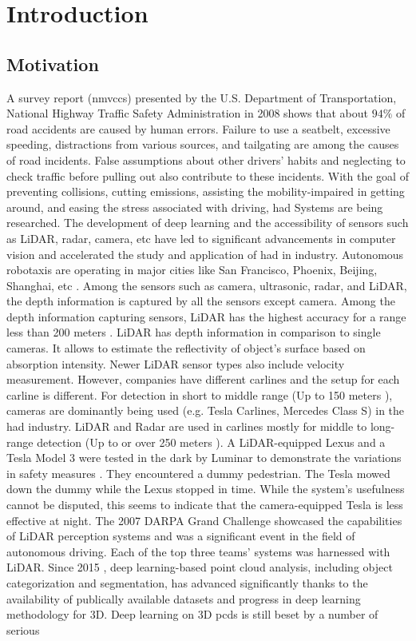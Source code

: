 \chapter{Introduction}

\section{Motivation}
A survey report (\acrshort{nmvccs}) presented by the  U.S. Department of Transportation, National Highway Traffic Safety Administration in 2008 \parencite{nmvccs} shows that about \(94\%\) of road accidents are caused by human errors. Failure to use a seatbelt, excessive speeding, distractions from various sources, and tailgating are among the causes of road incidents. False assumptions about other drivers' habits and neglecting to check traffic before pulling out also contribute to these incidents. With the goal of preventing collisions, cutting emissions, assisting the mobility-impaired in getting around, and easing the stress associated with driving, \acrfull{had} Systems are being researched. The development of deep learning and the accessibility of sensors such as LiDAR, radar, camera, etc have led to significant advancements in computer vision and accelerated the study and application of \acrshort{had} in industry. Autonomous robotaxis are operating in major cities like San Francisco, Phoenix, Beijing, Shanghai, etc \parencite{robotaxis}. Among the sensors such as camera, ultrasonic, radar, and LiDAR, the depth information is captured by all the sensors except camera. Among the depth information capturing sensors, LiDAR has the highest accuracy for a range less than 200 meters \parencite{Yurtsever_2020}. LiDAR has depth information in comparison to single cameras. It allows to estimate the reflectivity of object's surface based on absorption intensity. Newer LiDAR sensor types also include velocity measurement. However, companies have different carlines and the setup for each carline is different. For detection in short to middle range (Up to 150 meters \parencite{sensor_range}), cameras are dominantly being used (e.g. Tesla Carlines, Mercedes Class S) in the \acrshort{had} industry. LiDAR and Radar are used in carlines mostly for middle to long-range detection (Up to or over 250 meters \parencite{sensor_range}). A LiDAR-equipped Lexus and a Tesla Model 3 were tested in the dark by Luminar to demonstrate the variations in safety measures \parencite{tesla_vs_lexus}. They encountered a dummy pedestrian. The Tesla mowed down the dummy while the Lexus stopped in time. While the system's usefulness cannot be disputed, this seems to indicate that the camera-equipped Tesla is less effective at night. The 2007 DARPA Grand Challenge showcased the capabilities of LiDAR perception systems and was a significant event in the field of autonomous driving. Each of the top three teams' systems was harnessed with LiDAR. Since 2015 \parencite{guo2020deep}, deep learning-based point cloud analysis, including object categorization and segmentation, has advanced significantly thanks to the availability of publically available datasets and progress in deep learning methodology for 3D. Deep learning on 3D \acrshort{pcd}s is still beset by a number of serious 